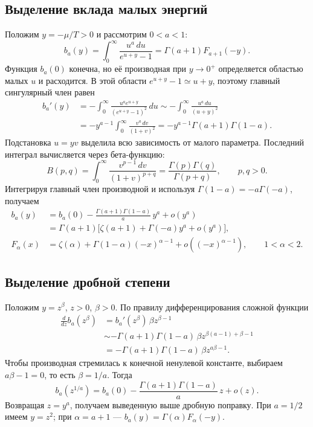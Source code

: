 \documentclass[../final.tex]{subfiles}
\begin{document}
\subsection{Выделение вклада малых энергий}
Положим $y=-\mu/T>0$ и рассмотрим $0<a<1$:
\begin{equation*}
 b_a(y)=\int_0^\infty\frac{u^a\,du}{e^{u+y}-1}
 =\Gamma(a+1)F_{a+1}(-y).
\end{equation*}
Функция $b_a(0)$ конечна, но её производная при $y\to0^+$ определяется
областью малых $u$ и расходится. В этой области $e^{u+y}-1\simeq u+y$,
поэтому главный сингулярный член равен
\begin{align*}
 b_a'(y)&=-\int_0^\infty
 \frac{u^a e^{u+y}}{(e^{u+y}-1)^2}\,du
 \sim-\int_0^\infty\frac{u^a\,du}{(u+y)^2}\\
 &=-y^{a-1}\int_0^\infty\frac{v^a\,dv}{(1+v)^2}
 =-y^{a-1}\Gamma(a+1)\Gamma(1-a).
\end{align*}
Подстановка $u=yv$ выделила всю зависимость от малого параметра.
Последний интеграл вычисляется через бета-функцию:
\begin{equation*}
 B(p,q)=\int_0^\infty\frac{v^{p-1}\,dv}{(1+v)^{p+q}}
 =\frac{\Gamma(p)\Gamma(q)}{\Gamma(p+q)},\qquad p,q>0.
\end{equation*}
Интегрируя главный член производной и используя
$\Gamma(1-a)=-a\Gamma(-a)$, получаем
\begin{align*}
 b_a(y)&=b_a(0)-\frac{\Gamma(a+1)\Gamma(1-a)}{a}\,y^a+o(y^a)\\
 &=\Gamma(a+1)\bigl[\zeta(a+1)+\Gamma(-a)y^a+o(y^a)\bigr],\\
 F_\alpha(x)&=\zeta(\alpha)+\Gamma(1-\alpha)(-x)^{\alpha-1}
 +o\!\left((-x)^{\alpha-1}\right),\qquad1<\alpha<2.
\end{align*}
\subsection{Выделение дробной степени}
Положим $y=z^\beta$, $z>0$, $\beta>0$. По правилу дифференцирования сложной функции
\begin{align*}
 \frac{d}{dz}b_a(z^\beta)
 &=b_a'(z^\beta)\,\beta z^{\beta-1}\\
 &\sim-\Gamma(a+1)\Gamma(1-a)\,
 \beta z^{\beta(a-1)+\beta-1}\\
 &=-\Gamma(a+1)\Gamma(1-a)\,\beta z^{a\beta-1}.
\end{align*}
Чтобы производная стремилась к конечной ненулевой константе, выбираем
$a\beta-1=0$, то есть $\beta=1/a$. Тогда
\begin{equation*}
 b_a(z^{1/a})=b_a(0)
 -\frac{\Gamma(a+1)\Gamma(1-a)}{a}\,z+o(z).
\end{equation*}
Возвращая $z=y^a$, получаем выведенную выше дробную поправку.
При $a=1/2$ имеем $y=z^2$; при $\alpha=a+1$ ---
$b_a(y)=\Gamma(\alpha)F_\alpha(-y)$.
\end{document}
